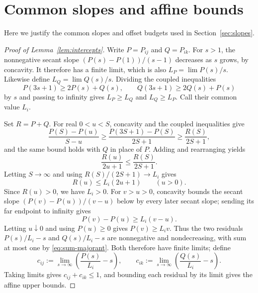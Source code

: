 \documentclass[11pt]{article}
\begin{document}
\section{Common slopes and affine bounds}\label{app:slopes}\label{app:slopes-angular}

Here we justify the common slopes and offset budgets used in Section~\ref{sec:slopes}.

\begin{proof}[Proof of Lemma~\ref{lem:intercepts}]
Write $P=P_{ij}$ and $Q=P_{ik}$. For $s>1$, the nonnegative secant
slope $(P(s)-P(1))/(s-1)$ decreases as $s$ grows, by concavity.
It therefore has a finite limit, which is also $L_P=\lim P(s)/s$.
Likewise define
$L_Q=\lim Q(s)/s$. Dividing the coupled inequalities
\[
 P(3s+1)\ge2P(s)+Q(s),\qquad
 Q(3s+1)\ge2Q(s)+P(s)
\]
by $s$ and passing to infinity gives $L_P\ge L_Q$ and $L_Q\ge L_P$.
Call their common value $L_i$.

Set $R=P+Q$. For real $0<u<S$, concavity and the coupled inequalities give
\[
 \frac{P(S)-P(u)}{S-u}
 \ge\frac{P(3S+1)-P(S)}{2S+1}
 \ge\frac{R(S)}{2S+1},
\]
and the same bound holds with $Q$ in place of $P$.
Adding and rearranging yields
\[
 \frac{R(u)}{2u+1}\le\frac{R(S)}{2S+1}.
\]
Letting $S\to\infty$ and using $R(S)/(2S+1)\to L_i$ gives
\begin{equation}\label{eq:sum-majorant}
 R(u)\le L_i(2u+1)\qquad(u>0).
\end{equation}
Since $R(u)>0$, we have $L_i>0$. For $v>u>0$, concavity bounds
the secant slope $(P(v)-P(u))/(v-u)$ below by every later secant slope;
sending its far endpoint to infinity gives
\[
 P(v)-P(u)\ge L_i(v-u).
\]
Letting $u\downarrow0$ and using $P(u)\ge0$ gives
$P(v)\ge L_i v$. Thus the two residuals $P(s)/L_i-s$ and $Q(s)/L_i-s$
are nonnegative and nondecreasing, with sum at most one by
\eqref{eq:sum-majorant}. Both therefore have finite limits; define
\[
 c_{ij}:=\lim_{s\to\infty}\left(\frac{P(s)}{L_i}-s\right),\qquad
 c_{ik}:=\lim_{s\to\infty}\left(\frac{Q(s)}{L_i}-s\right).
\]
Taking limits gives $c_{ij}+c_{ik}\le1$, and bounding each residual by
its limit gives the affine upper bounds.
\end{proof}
\end{document}

